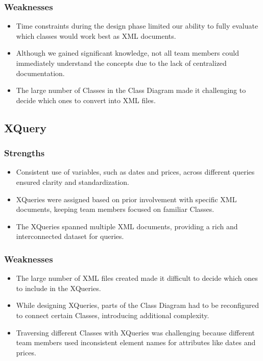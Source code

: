 \documentclass{article} %
\begin{document}
\subsubsection{Weaknesses}
\begin{itemize}
    \item Time constraints during the design phase limited our ability to fully evaluate which classes would work best as XML documents.
    \item Although we gained significant knowledge, not all team members could immediately understand the concepts due to the lack of centralized documentation.
    \item The large number of Classes in the Class Diagram made it challenging to decide which ones to convert into XML files.
\end{itemize}

\subsection{XQuery}

\subsubsection{Strengths}
\begin{itemize}
    \item Consistent use of variables, such as dates and prices, across different queries ensured clarity and standardization.
    \item XQueries were assigned based on prior involvement with specific XML documents, keeping team members focused on familiar Classes.
    \item The XQueries spanned multiple XML documents, providing a rich and interconnected dataset for queries.
\end{itemize}

\subsubsection{Weaknesses}
\begin{itemize}
    \item The large number of XML files created made it difficult to decide which ones to include in the XQueries.
    \item While designing XQueries, parts of the Class Diagram had to be reconfigured to connect certain Classes, introducing additional complexity.
    \item Traversing different Classes with XQueries was challenging because different team members used inconsistent element names for attributes like dates and prices.
\end{itemize}
\end{document}
